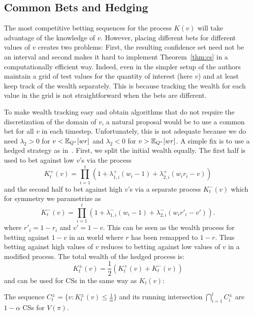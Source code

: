 \subsection{Common Bets and Hedging}
\label{sec:hedged}
The most competitive betting sequences for the process $K(v)$ will take
advantage of the knowledge of $v$. However, placing different bets for
different values of $v$ creates two problems: First, the resulting confidence
set need not be an interval and second makes it hard to implement
Theorem~\ref{thm:cs} in a computationally efficient way.  Indeed, even in the
simpler setup of \citet{waudby-smith_variance-adaptive_2020} the authors
maintain a grid of test values for the quantity of interest (here $v$)  and at
least keep track of the wealth separately.  This is because tracking the wealth
for each value in the grid is not straightforward when the bets are different. 

To make wealth tracking easy and obtain algorithms that do not require the
discretization of the domain of $v$, a natural proposal would be to use a
common bet for all $v$ in each timestep. Unfortunately, this is not adequate
because we do need $\lambda_2 > 0$ for $v<\mathbb{E}_{Q^*}[wr]$ and $\lambda_2 < 0$ for
$v>\mathbb{E}_{Q^*}[wr]$.  A simple fix is to use a hedged strategy as
in~\citet{waudby-smith_variance-adaptive_2020}.  First, we split the initial
wealth equally.  The first half is used to bet against low $v$'s via the process
\[
K_t^{+}(v) = \prod_{i=1}^t \left(1+\lambda_{1,i}^{+}(w_i-1)+\lambda_{2,i}^{+}(w_i r_i -v)\right)
\]
and the second half to bet against high $v$'s via a separate process
$K_t^{-}(v)$ which for symmetry we parametrize as
\[
K_t^{-}(v) = \prod_{i=1}^t \left(1+\lambda_{1,i}^{-}(w_i-1)+\lambda_{2,i}^{-}(w_i r'_i -v')\right).
\]
where $r'_i=1-r_i$ and $v'=1-v$.  This can be seen as the wealth process for
betting against $1-v$ in an world where $r$ has been remapped to $1-r$.  Thus
betting against high values of $v$ reduces to betting against low values of $v$
in a modified process. The total wealth of the hedged process is:
\begin{equation}
K_t^{\pm}(v) = \frac{1}{2} (K_t^{+}(v) + K_t^{-}(v))
\label{eq:hedged}
\end{equation}
and can be used for CSs in the same way as $K_t(v)$:
\begin{theorem}
\label{thm:hedged}
The sequence $C_t^{\pm} = \{v:K_t^{\pm}(v)\leq \frac{1}{\alpha}\}$ and its 
running intersection $\bigcap_{i=1}^t C_i^{\pm}$
are $1-\alpha$ CSs for $V(\pi)$.
\end{theorem}

